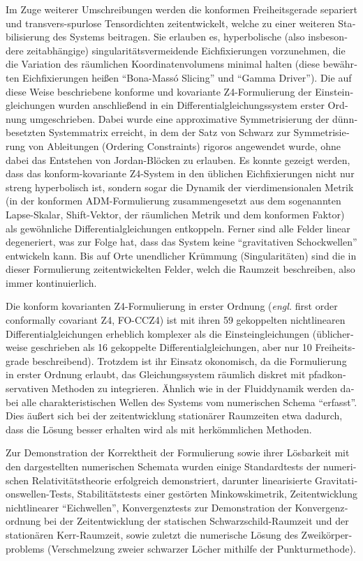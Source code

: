 \begin{otherlanguage}{german}
\begin{fullwidth}
\begin{center}
\begin{adjustwidth}{1cm}{1cm}
Im Zuge weiterer Umschreibungen werden die konformen Freiheitsgerade 
separiert und
transvers-spurlose Tensordichten zeitentwickelt, welche zu einer weiteren
Stabilisierung des Systems beitragen. Sie erlauben es, hyperbolische (also
insbesondere zeitabhängige) singularitätsvermeidende Eichfixierungen 
vorzunehmen,
die die Variation des räumlichen Koordinatenvolumens minimal halten
(diese bewährten Eichfixierungen heißen ``Bona-Massó Slicing'' und ``Gamma Driver'').
Die auf diese Weise beschriebene konforme und kovariante Z4-Formulierung der
Einsteingleichungen wurden anschließend in ein
Differentialgleichungssystem erster Ordnung umgeschrieben. Dabei wurde eine
approximative Symmetrisierung der dünnbesetzten Systemmatrix erreicht, in dem
der Satz von Schwarz zur Symmetrisierung von Ableitungen (Ordering Constraints)
rigoros angewendet wurde, ohne dabei das Entstehen von Jordan-Blöcken zu
erlauben. Es konnte gezeigt werden, dass das konform-kovariante Z4-System in den
üblichen Eichfixierungen nicht nur streng hyperbolisch ist, sondern sogar die
Dynamik der vierdimensionalen Metrik (in der konformen ADM-Formulierung
zusammengesetzt aus dem sogenannten Lapse-Skalar, Shift-Vektor, der
räumlichen Metrik und dem konformen Faktor) als gewöhnliche Differentialgleichungen
entkoppeln. Ferner sind alle Felder linear degeneriert, was zur Folge hat, dass das
System keine ``gravitativen Schockwellen'' entwickeln kann. Bis auf Orte 
unendlicher
Krümmung (Singularitäten) sind die in dieser Formulierung zeitentwickelten Felder,
welch die Raumzeit beschreiben, also immer kontinuierlich.

Die konform kovarianten Z4-Formulierung in erster Ordnung (\emph{engl.}
first order conformally covariant Z4, FO-CCZ4) ist mit ihren 59 gekoppelten
nichtlinearen Differentialgleichungen erheblich komplexer als die
Einsteingleichungen (üblicherweise geschrieben als 16 gekoppelte
Differentialgleichungen, aber nur 10 Freiheitsgrade beschreibend).
Trotzdem ist ihr Einsatz okonomisch, da die Formulierung in erster Ordnung 
erlaubt,
das Gleichungssystem räumlich diskret mit pfadkonservativen Methoden zu
integrieren. Ähnlich wie in der Fluiddynamik
werden dabei alle charakteristischen Wellen des Systems vom numerischen
Schema ``erfasst''. Dies äußert sich bei der zeitentwicklung stationärer
Raumzeiten etwa dadurch, dass die Lösung besser erhalten wird als mit herkömmlichen
Methoden.

Zur Demonstration der Korrektheit der Formulierung sowie ihrer Lösbarkeit mit den
dargestellten numerischen Schemata wurden einige Standardtests der numerischen
Relativitätstheorie erfolgreich demonstriert, darunter linearisierte
Gravitationswellen-Tests, Stabilitätstests einer gestörten Minkowskimetrik,
Zeitentwicklung nichtlinearer ``Eichwellen'', Konvergenztests zur Demonstration
der Konvergenzordnung bei der Zeitentwicklung der statischen Schwarzschild-Raumzeit
und der stationären Kerr-Raumzeit, sowie zuletzt die numerische Lösung des
Zweikörper\-problems (Verschmelzung zweier schwarzer Löcher mithilfe der
Punkturmethode).


\end{adjustwidth}
\end{center}
\end{fullwidth}
\end{otherlanguage}
